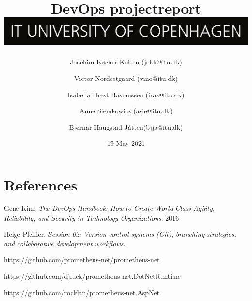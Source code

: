 \documentclass{article}
\title{DevOps projectreport \\[2ex] \includegraphics[scale=0.1]{images/ITU_logo_UK.jpg}}
\author{Joachim Køcher Kelsen (jokk@itu.dk) \and Victor Nordestgaard (vino@itu.dk) \and Isabella Drest Rasmussen (iras@itu.dk) \and Anne Siemkowicz (asie@itu.dk) \and Bjørnar Haugstad Jåtten(bjja@itu.dk)}
\date{19 May 2021}
\begin{document}
{}

\maketitle

\newpage

\tableofcontents

\newpage



\newpage



\newpage



\newpage



\newpage

\section{References}

\begin{thebibliography}{9}
Gene Kim.
\textit{The DevOps Handbook: How to Create World-Class Agility, Reliability, and Security in Technology Organizations}. 
2016

Helge Pfeiffer. 
\textit{Session 02: Version control systems (Git), branching strategies, and collaborative development workflows}. 

https://github.com/prometheus-net/prometheus-net

https://github.com/djluck/prometheus-net.DotNetRuntime

https://github.com/rocklan/prometheus-net.AspNet

\end{thebibliography}

\newpage
\end{document}
